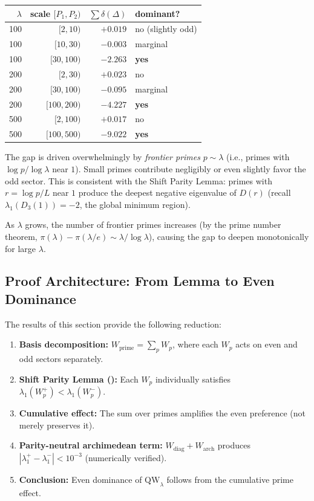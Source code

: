 \documentclass[12pt,a4paper]{article}
\theoremstyle{definition}
\theoremstyle{remark}
\begin{document}
\begin{center}
\renewcommand{\arraystretch}{1.15}
\begin{tabular}{r|r|r|l}
$\lambda$ & scale $[P_1, P_2)$ & $\sum \delta(\Delta)$ & dominant? \\\hline
100 & $[2, 10)$ & $+0.019$ & no (slightly odd) \\
100 & $[10, 30)$ & $-0.003$ & marginal \\
100 & $[30, 100)$ & $-2.263$ & \textbf{yes} \\[3pt]
200 & $[2, 30)$ & $+0.023$ & no \\
200 & $[30, 100)$ & $-0.095$ & marginal \\
200 & $[100, 200)$ & $-4.227$ & \textbf{yes} \\[3pt]
500 & $[2, 100)$ & $+0.017$ & no \\
500 & $[100, 500)$ & $-9.022$ & \textbf{yes}
\end{tabular}
\end{center}

The gap is driven overwhelmingly by \emph{frontier primes} $p \sim \lambda$ (i.e., primes with $\log p / \log\lambda$ near $1$). Small primes contribute negligibly or even slightly favor the odd sector. This is consistent with the Shift Parity Lemma: primes with $r = \log p / L$ near $1$ produce the deepest negative eigenvalue of $D(r)$ (recall $\lambda_1(D_3(1)) = -2$, the global minimum region).

As $\lambda$ grows, the number of frontier primes increases (by the prime number theorem, $\pi(\lambda) - \pi(\lambda/e) \sim \lambda/\log\lambda$), causing the gap to deepen monotonically for large $\lambda$.

\subsection{Proof Architecture: From Lemma to Even Dominance}

The results of this section provide the following reduction:

\begin{enumerate}
  \item \textbf{Basis decomposition:} $W_{\mathrm{prime}} = \sum_p W_p$, where each $W_p$ acts on even and odd sectors separately.
  \item \textbf{Shift Parity Lemma ():} Each $W_p$ individually satisfies $\lambda_1(W_p^+) < \lambda_1(W_p^-)$.
  \item \textbf{Cumulative effect:} The sum over primes amplifies the even preference (not merely preserves it).
  \item \textbf{Parity-neutral archimedean term:} $W_{\mathrm{diag}} + W_{\mathrm{arch}}$ produces $|\lambda_1^+ - \lambda_1^-| < 10^{-3}$ (numerically verified).
  \item \textbf{Conclusion:} Even dominance of $\mathrm{QW}_\lambda$ follows from the cumulative prime effect.
\end{enumerate}
\end{document}
